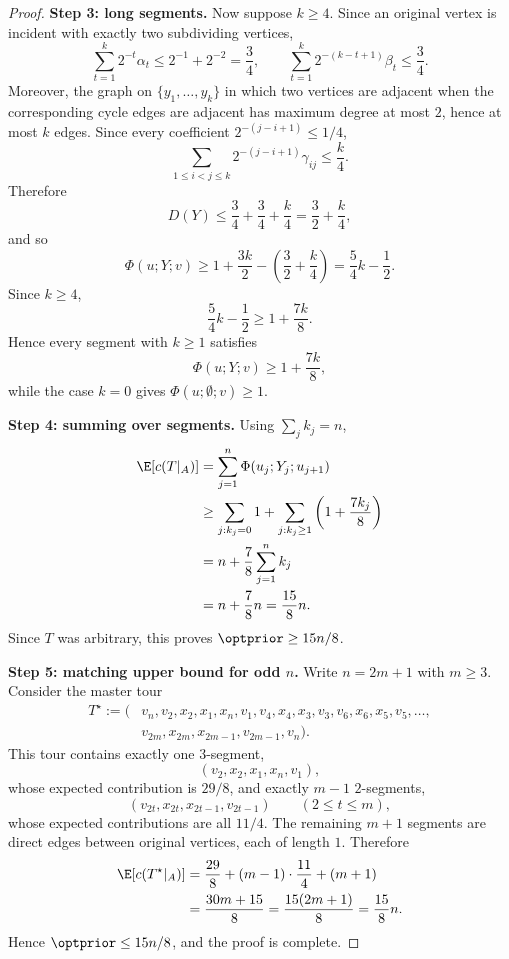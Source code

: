 \begin{proof}
\medskip
\noindent\textbf{Step 3: long segments.}
Now suppose $k\ge 4$. Since an original vertex is incident with exactly two subdividing vertices,
\[
\sum_{t=1}^k 2^{-t}\alpha_t\le 2^{-1}+2^{-2}=\frac34,
\qquad
\sum_{t=1}^k 2^{-(k-t+1)}\beta_t\le \frac34.
\]
Moreover, the graph on $\{y_1,\dots,y_k\}$ in which two vertices are adjacent when the corresponding cycle edges are adjacent has maximum degree at most $2$, hence at most $k$ edges. Since every coefficient $2^{-(j-i+1)}\le 1/4$,
\[
\sum_{1\le i<j\le k}2^{-(j-i+1)}\gamma_{ij}\le \frac{k}{4}.
\]
Therefore
\[
D(Y)\le \frac34+\frac34+\frac{k}{4}=\frac32+\frac{k}{4},
\]
and so
\[
\Phi(u;Y;v)
\ge
1+\frac{3k}{2}-\left(\frac32+\frac{k}{4}\right)
=
\frac54k-\frac12.
\]
Since $k\ge 4$,
\[
\frac54k-\frac12\ge 1+\frac{7k}{8}.
\]
Hence every segment with $k\ge 1$ satisfies
\[
\Phi(u;Y;v)\ge 1+\frac{7k}{8},
\]
while the case $k=0$ gives $\Phi(u;\emptyset;v)\ge 1$.

\medskip
\noindent\textbf{Step 4: summing over segments.}
Using $\sum_j k_j=n$,
\begin{align*}
\E[c(T|_A)]
&=
\sum_{j=1}^n \Phi(u_j;Y_j;u_{j+1}) \\
&\ge
\sum_{j:k_j=0} 1 + \sum_{j:k_j\ge 1}\left(1+\frac{7k_j}{8}\right) \\
&=
 n + \frac78\sum_{j=1}^n k_j \\
&=
 n+\frac78n
=
\frac{15}{8}n.
\end{align*}
Since $T$ was arbitrary, this proves $\optprior\ge 15n/8$.

\medskip
\noindent\textbf{Step 5: matching upper bound for odd $n$.}
Write $n=2m+1$ with $m\ge 3$. Consider the master tour
\begin{align*}
T^\star:=(&v_n,v_2,x_2,x_1,x_n,v_1,
  v_4,x_4,x_3,v_3,
  v_6,x_6,x_5,v_5,
  \dots, \\
 &v_{2m},x_{2m},x_{2m-1},v_{2m-1},v_n).
\end{align*}
This tour contains exactly one $3$-segment,
\[
(v_2,x_2,x_1,x_n,v_1),
\]
whose expected contribution is $29/8$, and exactly $m-1$ $2$-segments,
\[
(v_{2t},x_{2t},x_{2t-1},v_{2t-1})
\qquad (2\le t\le m),
\]
whose expected contributions are all $11/4$. The remaining $m+1$ segments are direct edges between original vertices, each of length $1$. Therefore
\begin{align*}
\E[c(T^\star|_A)]
&=
\frac{29}{8}+(m-1)\cdot \frac{11}{4}+(m+1) \\
&=
\frac{30m+15}{8}
=
\frac{15(2m+1)}{8}
=
\frac{15}{8}n.
\end{align*}
Hence $\optprior\le 15n/8$, and the proof is complete.
\end{proof}

